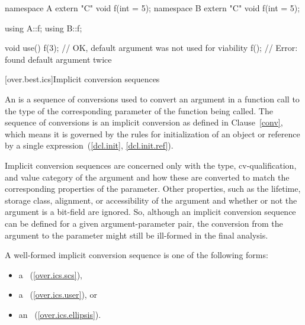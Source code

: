 \begin{codeblock}
namespace A {
  extern "C" void f(int = 5);
}
namespace B {
  extern "C" void f(int = 5);
}

using A::f;
using B::f;

void use() {
  f(3);                         // OK, default argument was not used for viability
  f();                          // Error: found default argument twice
}
\end{codeblock}
\exitexample

[over.best.ics]{Implicit conversion sequences}%

\pnum
An
%
is a sequence of conversions used
to convert an argument in a function call to the type of the
corresponding parameter of the function being called.
The
sequence of conversions is an implicit conversion as defined in
Clause~\ref{conv}, which means it is governed by the rules for
initialization of an object or reference by a single
expression~(\ref{dcl.init}, \ref{dcl.init.ref}).

\pnum
Implicit conversion sequences are concerned only with the type,
cv-qualification, and value category of the argument and how these
are converted to match the corresponding properties of the
parameter.
Other properties, such as the lifetime, storage class,
alignment, or accessibility of the argument and whether or not
the argument is a bit-field are ignored.
So, although an implicit
conversion sequence can be defined for a given argument-parameter
pair, the conversion from the argument to the parameter might still
be ill-formed in the final analysis.

\pnum
A
well-formed implicit conversion
sequence is one of the following forms:

\begin{itemize}
\item
a
~(\ref{over.ics.scs}),
\item
a
~(\ref{over.ics.user}), or
\item
an
~(\ref{over.ics.ellipsis}).
\end{itemize}

